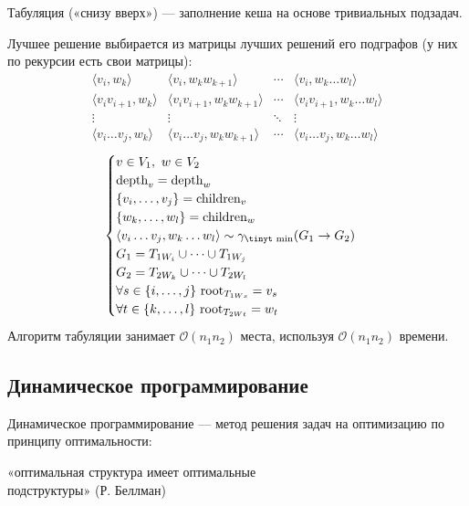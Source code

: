 {\bold Табуляция} {\ital\color{desc} («снизу вверх»)} --- заполнение кеша на основе тривиальных подзадач.

Лучшее решение выбирается из матрицы лучших решений его подграфов {\ital\color{desc} (у них по рекурсии есть свои матрицы)}:
$$\begin{matrix}
\langle v_i,w_k\rangle & \langle v_i,w_kw_{k+1}\rangle & \cdots & \langle v_i,w_k\dots w_l\rangle\\
\langle v_iv_{i+1},w_k\rangle & \langle v_iv_{i+1},w_kw_{k+1}\rangle & \cdots & \langle v_iv_{i+1},w_k\dots w_l\rangle\\
\vdots & \vdots & \ddots & \vdots\\
\langle v_i\dots v_j,w_k\rangle & \langle v_i\dots v_j,w_kw_{k+1}\rangle & \cdots & \langle v_i\dots v_j,w_k\dots w_l\rangle
\end{matrix}$$
$$\begin{cases}
v\in V_1,\ w\in V_2\\
\text{depth}_v=\text{depth}_w\\
\{v_i,\dots,v_j\}=\text{children}_v\\
\{w_k,\dots,w_l\}=\text{children}_w\\
\langle v_i\dots v_j,w_k\dots w_l\rangle\sim\gamma_{\text{\tinyt min}}(G_1\to G_2)\\
G_1=T_{1W_i}\cup\dots\cup T_{1W_j}\\
G_2=T_{2W_k}\cup\dots\cup T_{2W_l}\\
\forall s\in\{i,\dots,j\}\ \text{root}_{T_{1Ws}}=v_s\\
\forall t\in\{k,\dots,l\}\ \text{root}_{T_{2Wt}}=w_t
\end{cases}$$
Алгоритм табуляции занимает $\mathcal{O}(n_1n_2)$ места, используя $\mathcal{O}(n_1n_2)$ времени.


\subsection{Динамическое программирование}

{\bold Динамическое программирование} --- метод решения задач на оптимизацию {\ital по принципу оптимальности}:

{\centering «оптимальная структура имеет оптимальные\\
подструктуры» {\ital\color{desc} (Р. Беллман)}\par}

